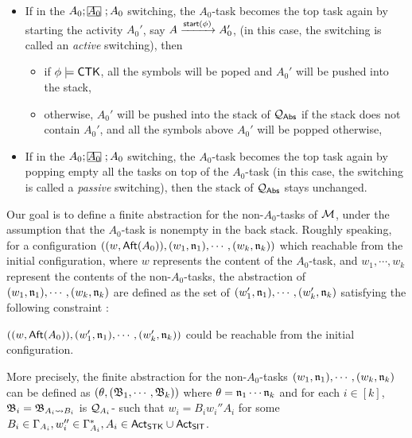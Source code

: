 \begin{itemize}
    \item If in the $A_0; \mhcancel{A_0}; A_0$ switching, the $A_0$-task becomes the top task again by starting the activity $A_0'$, say $A\xrightarrow{{\mathsf{start} }(\phi)}A_0'$, (in this case, the switching is called an \emph{active} switching), then
    \begin{itemize}
        \item if $\phi \models {\sf CTK}$, all the symbols will be poped and $A_0'$ will be pushed into the stack,
        \item otherwise, $A_0'$ will be pushed into the stack of  ${\mathcal{Q} }_{{\mathsf{Abs} }}$ if the stack does not contain $A_0'$, and all the symbols above $A_0'$ will be popped otherwise,
    \end{itemize}
%
    \item If in the $A_0; \mhcancel{A_0}; A_0$ switching, the $A_0$-task becomes the top task again by popping empty all the tasks on top of the $A_0$-task (in this case, the switching is called a \emph{passive} switching), then the stack of ${\mathcal{Q} }_{{\mathsf{Abs} }}$ stays unchanged.
        
\end{itemize}

Our goal is to define a finite abstraction for the non-$A_0$-tasks of ${\mathcal{M} }$, under the assumption that the $A_0$-task is nonempty in the back stack. 
Roughly speaking, for a configuration $((w,{\sf Aft}(A_0)),(w_1,\mathfrak{n}_1),\cdots,(w_k,\mathfrak{n}_k))$ which reachable from the initial configuration, where $w$ represents the content of the $A_0$-task, and $w_1,\cdots,w_k$ represent the contents of the non-$A_0$-tasks, the abstraction of $(w_1,\mathfrak{n}_1),\cdots,(w_k,\mathfrak{n}_k)$ are defined as the set of $(w_1',\mathfrak{n}_1),\cdots,(w_k',\mathfrak{n}_k)$ satisfying the following constraint :
\begin{center}
$((w,{\sf Aft}(A_0)),(w_1',\mathfrak{n}_1),\cdots,(w_k',\mathfrak{n}_k))$ could be reachable from the initial configuration.
\end{center}
More precisely, the finite abstraction for the non-$A_0$-tasks $(w_1,\mathfrak{n}_1),\cdots,(w_k,\mathfrak{n}_k)$ can be defined as $(\theta,({\mathfrak{B} }_1,\cdots,{\mathfrak{B} }_k))$ where $\theta = \mathfrak{n}_1\cdots\mathfrak{n}_k$ and for each $i\in[k]$, ${\mathfrak{B} }_i = {\mathfrak{B} }_{A_i\rightsquigarrow B_i}$ is ${\mathcal{Q} }_{A_i}$-{\WOTrNFA} such that $w_i = B_iw_i''A_i$ for some $B_i\in\Gamma_{A_i}, w_i''\in\Gamma_{A_i}^*, A_i\in{\sf Act}_{\mathsf{STK}}\cup{\sf Act}_{\mathsf{SIT}}$.

